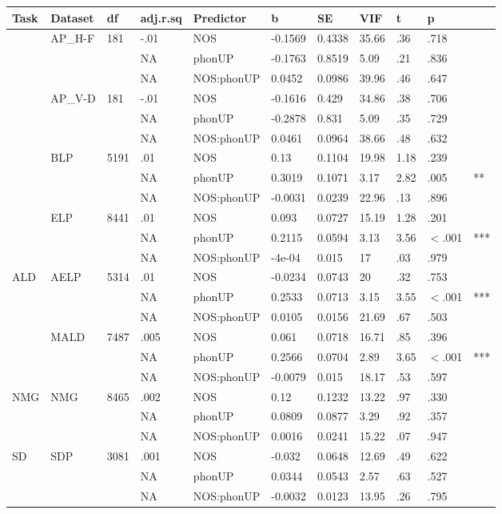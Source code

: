 \begin{table}[ht]
\centering
\begingroup\normalsize
\begin{tabular}{lllllllllll}
  \hline
Task & Dataset & df & adj.r.sq & Predictor & b & SE & VIF & t & p &  \\ 
  \hline
 & AP\_H-F & 181 & -.01 & NOS & -0.1569 & 0.4338 & 35.66 & .36 & .718 &   \\ 
   &  &  & NA & phonUP & -0.1763 & 0.8519 & 5.09 & .21 & .836 &   \\ 
   &  &  & NA & NOS:phonUP & 0.0452 & 0.0986 & 39.96 & .46 & .647 &   \\ 
   & AP\_V-D & 181 & -.01 & NOS & -0.1616 & 0.429 & 34.86 & .38 & .706 &   \\ 
   &  &  & NA & phonUP & -0.2878 & 0.831 & 5.09 & .35 & .729 &   \\ 
   &  &  & NA & NOS:phonUP & 0.0461 & 0.0964 & 38.66 & .48 & .632 &   \\ 
   & BLP & 5191 & .01 & NOS & 0.13 & 0.1104 & 19.98 & 1.18 & .239 &   \\ 
   &  &  & NA & phonUP & 0.3019 & 0.1071 & 3.17 & 2.82 & .005 & ** \\ 
   &  &  & NA & NOS:phonUP & -0.0031 & 0.0239 & 22.96 & .13 & .896 &   \\ 
   & ELP & 8441 & .01 & NOS & 0.093 & 0.0727 & 15.19 & 1.28 & .201 &   \\ 
   &  &  & NA & phonUP & 0.2115 & 0.0594 & 3.13 & 3.56 & $<$.001 & *** \\ 
   &  &  & NA & NOS:phonUP & -4e-04 & 0.015 & 17 & .03 & .979 &   \\ 
  ALD & AELP & 5314 & .01 & NOS & -0.0234 & 0.0743 & 20 & .32 & .753 &   \\ 
   &  &  & NA & phonUP & 0.2533 & 0.0713 & 3.15 & 3.55 & $<$.001 & *** \\ 
   &  &  & NA & NOS:phonUP & 0.0105 & 0.0156 & 21.69 & .67 & .503 &   \\ 
   & MALD & 7487 & .005 & NOS & 0.061 & 0.0718 & 16.71 & .85 & .396 &   \\ 
   &  &  & NA & phonUP & 0.2566 & 0.0704 & 2.89 & 3.65 & $<$.001 & *** \\ 
   &  &  & NA & NOS:phonUP & -0.0079 & 0.015 & 18.17 & .53 & .597 &   \\ 
  NMG & NMG & 8465 & .002 & NOS & 0.12 & 0.1232 & 13.22 & .97 & .330 &   \\ 
   &  &  & NA & phonUP & 0.0809 & 0.0877 & 3.29 & .92 & .357 &   \\ 
   &  &  & NA & NOS:phonUP & 0.0016 & 0.0241 & 15.22 & .07 & .947 &   \\ 
  SD & SDP & 3081 & .001 & NOS & -0.032 & 0.0648 & 12.69 & .49 & .622 &   \\ 
   &  &  & NA & phonUP & 0.0344 & 0.0543 & 2.57 & .63 & .527 &   \\ 
   &  &  & NA & NOS:phonUP & -0.0032 & 0.0123 & 13.95 & .26 & .795 &   \\ 
   \hline
\end{tabular}
\endgroup
\end{table}
